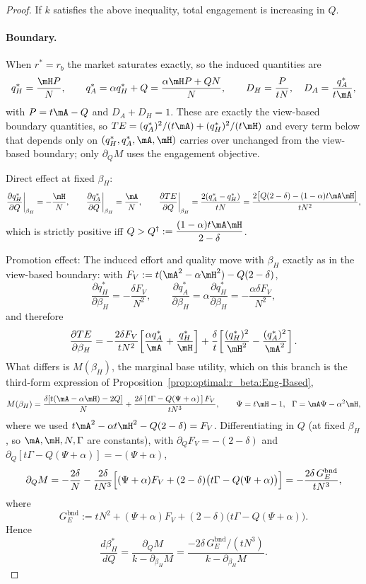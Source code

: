 \begin{proof}
If $k$ satisfies the above inequality, total engagement is increasing in $Q$.

\paragraph{Boundary.}
When $r^*=r_b$ the market saturates exactly, so the induced quantities are
\[
q_H^* = \frac{\mH P}{N}, \qquad
q_A^* = \alpha q_H^* + Q = \frac{\alpha\mH P + QN}{N},
\qquad
D_H = \frac{P}{tN}, \quad D_A = \frac{q_A^*}{t\mA},
\]
with $P = t\mA - Q$ and $D_A+D_H=1$. These are exactly the view-based boundary
quantities, so $TE = (q_A^*)^2/(t\mA) + (q_H^*)^2/(t\mH)$ and every term below that
depends only on $(q_H^*,q_A^*,\mA,\mH)$ carries over unchanged from the view-based
boundary; only $\partial_Q M$ uses the engagement objective.

Direct effect at fixed $\beta_H$:
\[
\frac{\partial q_H^*}{\partial Q}\bigg|_{\beta_H} = -\frac{\mH}{N},
\qquad
\frac{\partial q_A^*}{\partial Q}\bigg|_{\beta_H} = \frac{\mA}{N},
\qquad
\frac{\partial TE}{\partial Q}\bigg|_{\beta_H}
= \frac{2(q_A^*-q_H^*)}{tN}
= \frac{2\bigl[Q(2-\delta) - (1-\alpha)t\mA\mH\bigr]}{tN^2},
\]
which is strictly positive iff $Q > Q^{\dagger} := \dfrac{(1-\alpha)t\mA\mH}{2-\delta}$.

Promotion effect:
The induced effort and quality move with $\beta_H$ exactly as in the view-based
boundary: with $F_V := t(\mA^2 - \alpha\mH^2) - Q(2-\delta)$,
\[
\frac{\partial q_H^*}{\partial\beta_H} = -\frac{\delta F_V}{N^2},
\qquad
\frac{\partial q_A^*}{\partial\beta_H} = \alpha\frac{\partial q_H^*}{\partial\beta_H}
= -\frac{\alpha\delta F_V}{N^2},
\]
and therefore
\[
\frac{\partial TE}{\partial\beta_H}
= -\frac{2\delta F_V}{tN^2}\!\left[\frac{\alpha q_A^*}{\mA} + \frac{q_H^*}{\mH}\right]
+ \frac{\delta}{t}\!\left[\frac{(q_H^*)^2}{\mH^2} - \frac{(q_A^*)^2}{\mA^2}\right].
\]
What differs is $M(\beta_H)$, the marginal base utility, which on this branch is the
third-form expression of Proposition~\ref{prop:optimal:r_beta:Eng-Based},
\[
M(\beta_H) = \frac{\delta[t(\mA-\alpha\mH) - 2Q]}{N}
+ \frac{2\delta\,[\,t\Gamma - Q(\Psi+\alpha)\,]\,F_V}{tN^3},
\qquad \Psi = t\mH - 1,\ \ \Gamma = \mA\Psi - \alpha^2\mH,
\]
where we used $t\mA^2 - \alpha t\mH^2 - Q(2-\delta) = F_V$. Differentiating in $Q$
(at fixed $\beta_H$, so $\mA,\mH,N,\Gamma$ are constants), with
$\partial_Q F_V = -(2-\delta)$ and $\partial_Q[t\Gamma - Q(\Psi+\alpha)] = -(\Psi+\alpha)$,
\[
\partial_Q M
= -\frac{2\delta}{N}
- \frac{2\delta}{tN^3}\Bigl[(\Psi+\alpha)F_V + (2-\delta)\bigl(t\Gamma - Q(\Psi+\alpha)\bigr)\Bigr]
= -\frac{2\delta\,G_E^{\mathrm{bnd}}}{tN^3},
\]
where
\[
G_E^{\mathrm{bnd}} := tN^2 + (\Psi+\alpha)F_V + (2-\delta)\bigl(t\Gamma - Q(\Psi+\alpha)\bigr).
\]
Hence
\[
\frac{d\beta_H^*}{dQ} = \frac{\partial_Q M}{k - \partial_{\beta_H}M}
= \frac{-2\delta\,G_E^{\mathrm{bnd}}/(tN^3)}{k - \partial_{\beta_H}M}.
\]


\end{proof}
